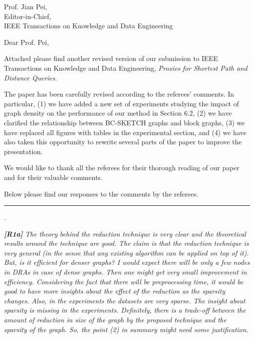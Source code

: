 \documentclass[11pt]{letter}
\date{}
\newcommand{\svs}{\vspace{0.36ex}}
\newcommand{\stitle}[1]{\vspace{0.5ex} \noindent{\bf #1}}
\begin{document}
\noindent
Prof. Jian Pei,\\
Editor-in-Chief,\\
IEEE Transactions on Knowledge and Data Engineering

\vspace{0.3cm}
\noindent
Dear Prof. Pei,


Attached please find another revised version of our submission to IEEE Transactions on Knowledge and Data Engineering,
{\em Proxies for Shortest Path and Distance Queries}.

The paper has been carefully revised according to the referees' comments. In particular,
%
(1) we have added a new set of experiments studying the impact of graph density on the performance of our method in Section 6.2,
%
(2) we have clarified the relationship between BC-SKETCH graphs and block graphs,
%
(3) we have replaced all figures with tables in the experimental section, and
%
(4) we have also taken this opportunity to rewrite several parts of the paper to improve the presentation.



We would like to thank all the referees for their thorough reading of our
paper and for their valuable comments.

Below please find our responses to the comments by the referees.

\vspace{3.6ex}
\hrule
\vspace{0.6ex}

\vspace{2ex} \stitle{Response to the comments of Referee 1}.

{\em
{\bf [R1a]} The theory behind the reduction technique is very clear and the theoretical results around the technique are good. The claim is that the reduction technique is very general
(in the sense that any existing algorithm can be applied on top of it).
But, is it efficient for denser graphs? I would expect there will be only a few nodes in DRAs in case of dense graphs. Then one might get very small improvement in efficiency. Considering
the fact that there will be preprocessing time, it would be good to have more insights about the effect of the reduction as the sparsity changes. Also, in the experiments the datasets are very sparse.
The insight about sparsity is missing in the experiments. Definitely, there is a trade-off between the amount of reduction in size of the graph by the proposed technique and the sparsity of the graph.
So, the point (2) in summary might need some justification.
}
\svs
\end{document}
